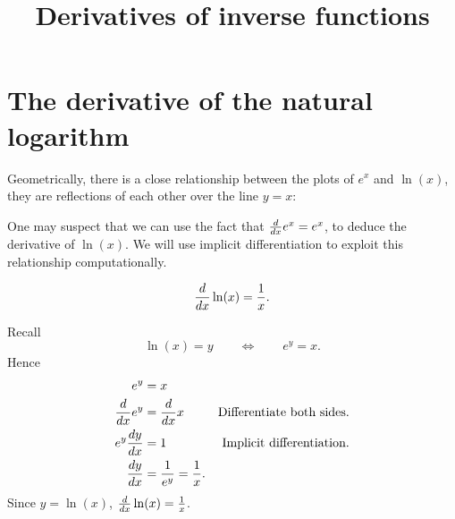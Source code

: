 \documentclass{ximera}
\title[Dig-In:]{Derivatives of inverse functions}
\begin{document}
\begin{abstract}
\end{abstract}
\maketitle


\section{The derivative of the natural logarithm}

Geometrically, there is a close relationship between the plots of
$e^x$ and $\ln(x)$, they are reflections of each other over the line
$y=x$:
\begin{image}
\end{image}
One may suspect that we can use the fact that $\ddx e^x = e^x$, to
deduce the derivative of $\ln(x)$.  We will use implicit
differentiation to exploit this relationship computationally.

\begin{theorem}
\[
\ddx \ln(x) = \frac{1}{x}.
\]
\begin{explanation}
Recall
\[
\ln(x) = y \qquad\Leftrightarrow\qquad e^y = x.
\]
Hence
\begin{align*}
e^y &= x\\
\ddx e^y &= \ddx x &\text{Differentiate both sides.}\\
e^y \dd[y]{x} &= 1 &\text{Implicit differentiation.}\\
\dd[y]{x} &= \frac{1}{e^y} = \frac{1}{x}.
\end{align*}
Since $y=\ln(x)$, $\ddx \ln(x) = \frac{1}{x}$.
\end{explanation}
\end{theorem}
\end{document}
